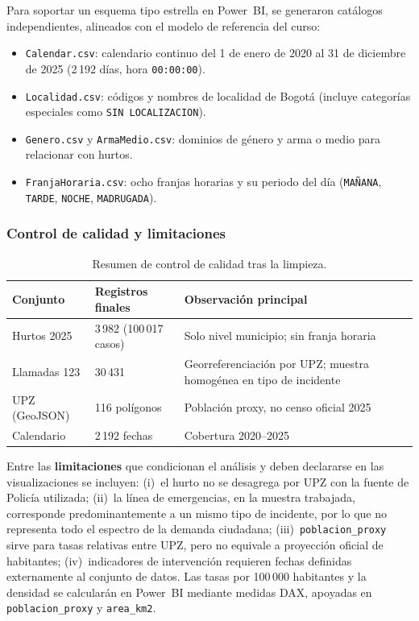 \documentclass[12pt,letterpaper]{article}
\begin{document}
Para soportar un esquema tipo estrella en Power~BI, se generaron catálogos independientes, alineados con el modelo de referencia del curso:
\begin{itemize}[noitemsep, topsep=0pt]
    \item \texttt{Calendar.csv}: calendario continuo del 1 de enero de 2020 al 31 de diciembre de 2025 (2\,192 días, hora \texttt{00:00:00}).
    \item \texttt{Localidad.csv}: códigos y nombres de localidad de Bogotá (incluye categorías especiales como \texttt{SIN LOCALIZACION}).
    \item \texttt{Genero.csv} y \texttt{ArmaMedio.csv}: dominios de género y arma o medio para relacionar con hurtos.
    \item \texttt{FranjaHoraria.csv}: ocho franjas horarias y su periodo del día (\texttt{MAÑANA}, \texttt{TARDE}, \texttt{NOCHE}, \texttt{MADRUGADA}).
\end{itemize}

\subsubsection{Control de calidad y limitaciones}

\begin{table}[H]
  \centering
  \caption{Resumen de control de calidad tras la limpieza.}
  \label{tab:qc-datasets}
  \small
  \begin{tabularx}{\linewidth}{lXX}
    \toprule
    \textbf{Conjunto} & \textbf{Registros finales} & \textbf{Observación principal} \\
    \midrule
    Hurtos 2025 & 3\,982 (100\,017 casos) & Solo nivel municipio; sin franja horaria \\
    Llamadas 123 & 30\,431 & Georreferenciación por UPZ; muestra homogénea en tipo de incidente \\
    UPZ (GeoJSON) & 116 polígonos & Población proxy, no censo oficial 2025 \\
    Calendario & 2\,192 fechas & Cobertura 2020--2025 \\
    \bottomrule
  \end{tabularx}
\end{table}

Entre las \textbf{limitaciones} que condicionan el análisis y deben declararse en las visualizaciones se incluyen: (i)~el hurto no se desagrega por UPZ con la fuente de Policía utilizada; (ii)~la línea de emergencias, en la muestra trabajada, corresponde predominantemente a un mismo tipo de incidente, por lo que no representa todo el espectro de la demanda ciudadana; (iii)~\texttt{poblacion\_proxy} sirve para tasas relativas entre UPZ, pero no equivale a proyección oficial de habitantes; (iv)~indicadores de intervención requieren fechas definidas externamente al conjunto de datos. Las tasas por 100\,000 habitantes y la densidad se calcularán en Power~BI mediante medidas DAX, apoyadas en \texttt{poblacion\_proxy} y \texttt{area\_km2}.
\end{document}
